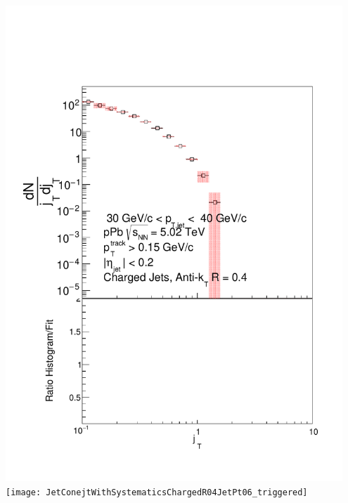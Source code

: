 \documentclass{beamer}
\begin{document}
\begin{frame}
\begin{columns}
\includegraphics[width=0.95\textwidth]{JetConejtWithSystematicsChargedR04JetPt03_triggered} \\
\texttt{[image: JetConejtWithSystematicsChargedR04JetPt06\_triggered]} \\

\end{columns}
\end{frame}
\end{document}
